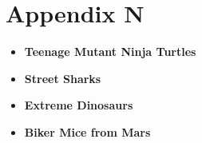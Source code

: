 \documentclass{book}
\begin{document}
\newpage














\chapter*{Appendix N}
\begin{itemize}
    \item \textbf{Teenage Mutant Ninja Turtles}
    \item \textbf{Street Sharks}
    \item \textbf{Extreme Dinosaurs}
    \item \textbf{Biker Mice from Mars}
\end{itemize}
\end{document}
